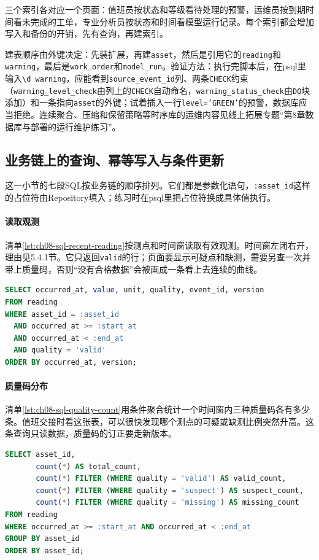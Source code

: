 三个索引各对应一个页面：值班员按状态和等级看待处理的预警，运维员按到期时间看未完成的工单，专业分析员按状态和时间看模型运行记录。每个索引都会增加写入和备份的开销，先有查询，再建索引。

建表顺序由外键决定：先装扩展，再建\texttt{asset}，然后是引用它的\texttt{reading}和\texttt{warning}，最后是\texttt{work\_order}和\texttt{model\_run}。验证方法：执行完脚本后，在psql里输入\texttt{\textbackslash d warning}，应能看到\texttt{source\_event\_id}列、两条\texttt{CHECK}约束（\texttt{warning\_level\_check}由列上的\texttt{CHECK}自动命名，\texttt{warning\_status\_check}由\texttt{DO}块添加）和一条指向\texttt{asset}的外键；试着插入一行\texttt{level='GREEN'}的预警，数据库应当拒绝。连续聚合、压缩和保留策略等时序库的运维内容见线上拓展专题“第8章数据库与部署的运行维护练习”。

\subsection{业务链上的查询、幂等写入与条件更新}

这一小节的七段SQL按业务链的顺序排列。它们都是参数化语句，\texttt{:asset\_id}这样的占位符由Repository填入；练习时在psql里把占位符换成具体值执行。

\paragraph{读取观测}清单\ref{lst:ch08-sql-recent-reading}按测点和时间窗读取有效观测。时间窗左闭右开，理由见5.4.1节。它只返回\texttt{valid}的行；页面要显示可疑点和缺测，需要另查一次并带上质量码，否则“没有合格数据”会被画成一条看上去连续的曲线。

\begin{lstlisting}[label={lst:ch08-sql-recent-reading},language=SQL,caption={按时间窗读取有效观测}]
SELECT occurred_at, value, unit, quality, event_id, version
FROM reading
WHERE asset_id = :asset_id
  AND occurred_at >= :start_at
  AND occurred_at < :end_at
  AND quality = 'valid'
ORDER BY occurred_at, version;
\end{lstlisting}

\paragraph{质量码分布}清单\ref{lst:ch08-sql-quality-count}用条件聚合统计一个时间窗内三种质量码各有多少条。值班交接时看这张表，可以很快发现哪个测点的可疑或缺测比例突然升高。这条查询只读数据，质量码的订正要走新版本。

\begin{lstlisting}[label={lst:ch08-sql-quality-count},language=SQL,caption={质量码分布统计查询}]
SELECT asset_id,
       count(*) AS total_count,
       count(*) FILTER (WHERE quality = 'valid') AS valid_count,
       count(*) FILTER (WHERE quality = 'suspect') AS suspect_count,
       count(*) FILTER (WHERE quality = 'missing') AS missing_count
FROM reading
WHERE occurred_at >= :start_at AND occurred_at < :end_at
GROUP BY asset_id
ORDER BY asset_id;
\end{lstlisting}

